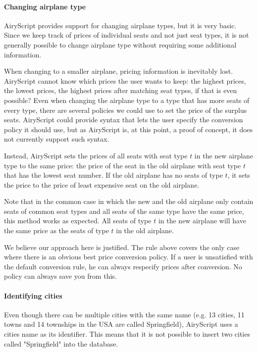 \paragraph{Changing airplane type}
AiryScript provides support for changing
airplane types, but it is very basic. Since we keep track of prices of
individual seats and not just seat types, it is not generally possible to change
airplane type without requiring some additional information.

When changing to a smaller airplane, pricing information is inevitably lost.
AiryScript cannot know which prices the user wants to keep: the highest prices,
the lowest prices, the highest prices after matching seat types, if that is even
possible? Even when changing the airplane type to a type that has more seats of
every type, there are several policies we could use to set the price of the
surplus seats.  AiryScript could provide syntax that lets the user specify the
conversion policy it should use, but as AiryScript is, at this point, a proof of
concept, it does not currently support such syntax.

Instead, AiryScript sets the prices of all seats with seat type $t$ in the new
airplane type to the same price: the price of the seat in the old airplane with
seat type $t$ that has the lowest seat number. If the old airplane has no seats
of type $t$, it sets the price to the price of least expensive seat on the old
airplane.

Note that in the common case in which the new and the old airplane only contain
seats of common seat types and all seats of the same type have the same price,
this method works as expected. All seats of type $t$ in the new airplane will
have the same price as the seats of type $t$ in the old airplane.

We believe our approach here is justified. The rule above covers the only case
where there is an obvious best price conversion policy. If a user is unsatisfied
with the default conversion rule, he can always respecify prices after
conversion. No policy can always save you from this.

\paragraph{Identifying cities}
Even though there can be multiple cities with the same name (e.g. 13
cities, 11 towns and 14 townships in the USA are called Springfield),
AiryScript uses a cities name as its identifier. This means that it is not
possible to insert two cities called "Springfield" into the database.

